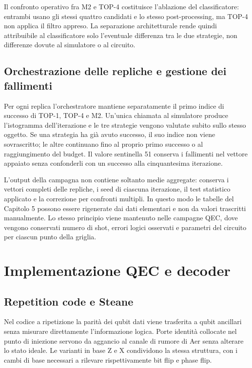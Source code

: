 Il confronto operativo fra M2 e TOP-4 costituisce l'ablazione del classificatore: entrambi usano gli stessi quattro candidati e lo stesso post-processing, ma TOP-4 non applica il filtro appreso. La separazione architetturale rende quindi attribuibile al classificatore solo l'eventuale differenza tra le due strategie, non differenze dovute al simulatore o al circuito.

\subsection{Orchestrazione delle repliche e gestione dei fallimenti}\label{sec:finale_4_5_3}

Per ogni replica l'orchestratore mantiene separatamente il primo indice di successo di TOP-1, TOP-4 e M2. Un'unica chiamata al simulatore produce l'istogramma dell'iterazione e le tre strategie vengono valutate subito sullo stesso oggetto. Se una strategia ha già avuto successo, il suo indice non viene sovrascritto; le altre continuano fino al proprio primo successo o al raggiungimento del budget. Il valore sentinella 51 conserva i fallimenti nel vettore appaiato senza confonderli con un successo alla cinquantesima iterazione.

L'output della campagna non contiene soltanto medie aggregate: conserva i vettori completi delle repliche, i seed di ciascuna iterazione, il test statistico applicato e la correzione per confronti multipli. In questo modo le tabelle del Capitolo 5 possono essere rigenerate dai dati elementari e non da valori trascritti manualmente. Lo stesso principio viene mantenuto nelle campagne QEC, dove vengono conservati numero di shot, errori logici osservati e parametri del circuito per ciascun punto della griglia.

\section{Implementazione QEC e decoder}\label{sec:finale_4_6}

\subsection{Repetition code e Steane}\label{sec:finale_4_6_1}

Nel codice a ripetizione la parità dei qubit dati viene trasferita a qubit ancillari senza misurare direttamente l'informazione logica. Porte identità collocate nel punto di iniezione servono da aggancio al canale di rumore di Aer senza alterare lo stato ideale. Le varianti in base Z e X condividono la stessa struttura, con i cambi di base necessari a rilevare rispettivamente bit flip e phase flip.

